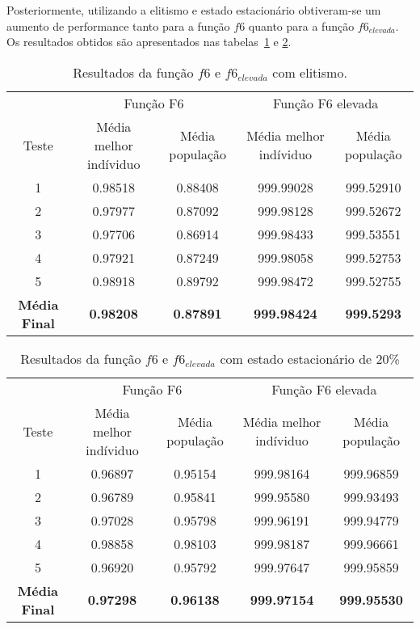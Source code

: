 	Posteriormente, utilizando a elitismo e estado estacionário obtiveram-se um aumento de performance tanto para a função
	$f6$ quanto para a função $f6_{elevada}$. Os resultados obtidos são apresentados nas tabelas~\ref{tab:f6_elitist}
	e \ref{tab:f6_stationary}.

	\begin{table}[!htb]
		\centering
		\begin{tabular}{|c|c|c|c|c|}
			\hline
			\rowcolor[HTML]{9B9B9B}
			& \multicolumn{2}{c}{Função F6} & \multicolumn{2}{c}{Função F6 elevada} \\
			\rowcolor[HTML]{9B9B9B}
			Teste & Média melhor indíviduo & Média população & Média melhor indíviduo & Média população \\\hline
			1 & 0.98518 & 0.88408 & 999.99028 & 999.52910 \\\hline
			2 & 0.97977 & 0.87092 & 999.98128 & 999.52672 \\\hline
			3 & 0.97706 & 0.86914 & 999.98433 & 999.53551 \\\hline
			4 & 0.97921 & 0.87249 & 999.98058 & 999.52753 \\\hline
			5 & 0.98918 & 0.89792 & 999.98472 & 999.52755 \\\hline
			\textbf{Média Final} & \textbf{0.98208} & \textbf{0.87891} & \textbf{999.98424} & \textbf{999.5293} \\\hline
		\end{tabular}
		\caption{Resultados da função $f6$ e $f6_{elevada}$ com elitismo. \label{tab:f6_elitist}}
	\end{table}

	\begin{table}[!htb]
		\centering
		\begin{tabular}{|c|c|c|c|c|}
			\hline
			\rowcolor[HTML]{9B9B9B}
			& \multicolumn{2}{c}{Função F6} & \multicolumn{2}{c}{Função F6 elevada} \\
			\rowcolor[HTML]{9B9B9B}
			Teste & Média melhor indíviduo & Média população & Média melhor indíviduo & Média população \\\hline
			1 & 0.96897 & 0.95154 & 999.98164 & 999.96859 \\\hline
			2 & 0.96789 & 0.95841 & 999.95580 & 999.93493 \\\hline
			3 & 0.97028 & 0.95798 & 999.96191 & 999.94779 \\\hline
			4 & 0.98858 & 0.98103 & 999.98187 & 999.96661 \\\hline
			5 & 0.96920 & 0.95792 & 999.97647 & 999.95859 \\\hline
			\textbf{Média Final} & \textbf{0.97298} & \textbf{0.96138} & \textbf{999.97154} & \textbf{999.95530} \\\hline
		\end{tabular}
		\caption{Resultados da função $f6$ e $f6_{elevada}$ com estado estacionário de 20\% \label{tab:f6_stationary}}
	\end{table}

